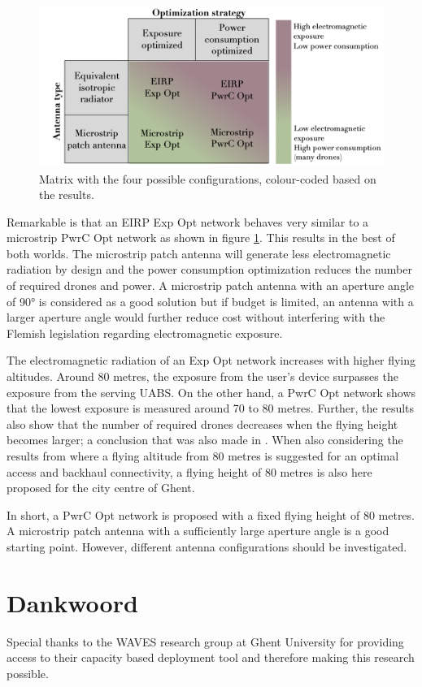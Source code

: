 \documentclass[twocolumn]{phdsymp_dutch}
\begin{document}
\begin{figure}[h!]
  \includegraphics[width=\linewidth]{fourCasesMatrixSol.png}
  \caption{Matrix with the four possible configurations, colour-coded based on the results.}
  \label{fig:resultIllustration}
\end{figure}

Remarkable is that an \gls{EIRP} \gls{Exp Opt} network behaves very similar to a microstrip \gls{PwrC Opt} network as shown 
in figure \ref{fig:resultIllustration}.
This results in the best of both worlds. 
The microstrip patch antenna will generate less electromagnetic radiation by design and
 the power consumption optimization reduces the number of required drones and power. A microstrip patch antenna with an aperture 
 angle of \ang{90} is considered as a good solution but if budget is limited, an antenna with a larger aperture angle 
 would further reduce cost without interfering with the Flemish legislation regarding electromagnetic exposure.

The electromagnetic radiation of an \gls{Exp Opt} network increases with higher flying altitudes.
Around 80 metres, the exposure from the  user's device surpasses the exposure from the serving \gls{UABS}.
On the other hand, a \gls{PwrC Opt} network shows that the lowest exposure is measured around 70 to 80 metres.
Further, the results also show that the number of required drones decreases when the flying height becomes larger; a conclusion that was also made in \cite{J2}.
When also considering the results from \cite{U1} where a flying altitude from 
80 metres is suggested for an optimal access and backhaul connectivity, a flying height 
of 80 metres is also here proposed for the city centre of Ghent.

In short, a \gls{PwrC Opt} network is proposed with a fixed flying height of 80 metres. A microstrip patch 
antenna with a sufficiently large aperture angle is a good starting point. However, different antenna configurations should 
be investigated.

\section*{Dankwoord}
Special thanks to the WAVES research group at Ghent University for providing 
access to their capacity based deployment tool and therefore making this research possible.



\end{document}
